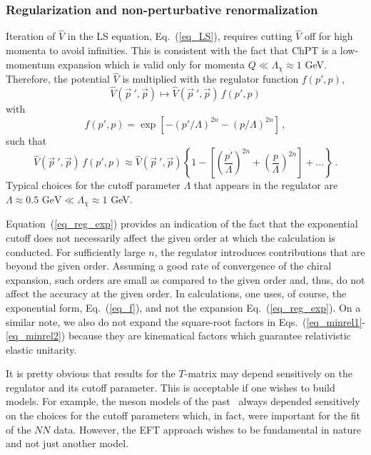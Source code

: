\documentclass[sort&compress,preprint,3p]{elsarticle}
\begin{document}
\subsubsection{Regularization and non-perturbative renormalization}
Iteration of $\widehat V$ in the LS equation, Eq.~(\ref{eq_LS}),
requires cutting $\widehat V$ off for high momenta to avoid infinities.
This is consistent with the fact that ChPT
is a low-momentum expansion which
is valid only for momenta $Q \ll \Lambda_\chi \approx 1$ GeV.
Therefore, the potential $\widehat V$
is multiplied
with the regulator function $f(p',p)$,
\begin{equation}
{\widehat V}(\vec{ p}~',{\vec p})
\longmapsto
{\widehat V}(\vec{ p}~',{\vec p}) \, f(p',p) 
\end{equation}
with
\begin{equation}
f(p',p) = \exp[-(p'/\Lambda)^{2n}-(p/\Lambda)^{2n}] \,,
\label{eq_f}
\end{equation}
such that
\begin{equation}
{\widehat V}(\vec{ p}~',{\vec p}) \, f(p',p) 
\approx
{\widehat V}(\vec{ p}~',{\vec p})
\left\{1-\left[\left(\frac{p'}{\Lambda}\right)^{2n}
+\left(\frac{p}{\Lambda}\right)^{2n}\right]+ \ldots \right\} 
\,.
\label{eq_reg_exp}
\end{equation}
Typical choices for the cutoff parameter $\Lambda$ that
appears in the regulator are 
$\Lambda \approx 0.5 \mbox{ GeV} \ll \Lambda_\chi \approx 1$ GeV.

Equation~(\ref{eq_reg_exp}) provides an indication of the fact that
the exponential cutoff does not necessarily
affect the given order at which 
the calculation is conducted.
For sufficiently large $n$, the regulator introduces contributions that 
are beyond the given order. Assuming a good rate
of convergence of the chiral expansion, such orders are small 
as compared to the given order and, thus, do not
affect the accuracy at the given order.
In calculations, one uses, of course,
the exponential form, Eq.~(\ref{eq_f}),
and not the expansion Eq.~(\ref{eq_reg_exp}). On a similar note, we also
do not expand the square-root factors
in Eqs.~(\ref{eq_minrel1}-\ref{eq_minrel2})
because they are kinematical factors which guarantee
relativistic elastic unitarity.



It is pretty obvious that results for the $T$-matrix may
depend sensitively on the regulator and its cutoff parameter.
This is acceptable if one wishes to build models.
For example, the meson models of the past~\cite{Mac89,MHE87}
always depended sensitively on the choices for the
cutoff parameters which, in fact,
were important for the fit of the $NN$ data.
However, the EFT approach wishes to be fundamental
in nature and not just another model.
\end{document}
